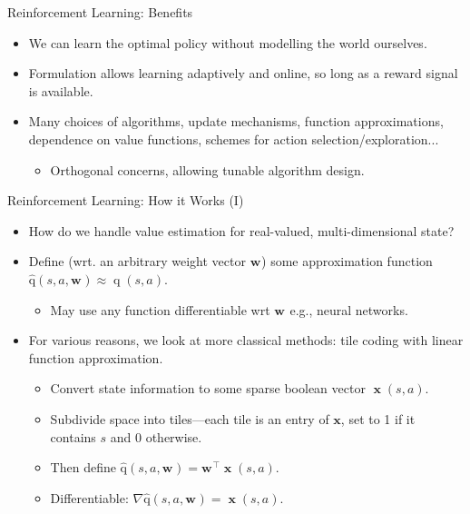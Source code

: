 \documentclass[aspectratio=169,xcolor={dvipsnames}
,hide notes
]{beamer}
\newcommand{\acval}[3]{\ensuremath{\operatorname{\hat{q}}(#1, #2, #3)}}
\newcommand{\wvec}[1]{\ensuremath{\bm{w}_{#1}}}
\begin{document}
\begin{frame}{Reinforcement Learning: Benefits}
\begin{itemize}
	\item We can learn the optimal policy \alert{without modelling the world ourselves}.
	\item Formulation allows learning adaptively and online, so long as a reward signal is available.
	\item Many choices of algorithms, update mechanisms, function approximations, dependence on value functions, schemes for action selection/exploration...
	\begin{itemize}
		\item Orthogonal concerns, allowing tunable algorithm design.
	\end{itemize}
\end{itemize}
\end{frame}

\begin{frame}{Reinforcement Learning: How it Works (I)}
\begin{itemize}
	\item How do we handle value estimation for real-valued, multi-dimensional state?
	\item Define (wrt. an arbitrary weight vector $\wvec{}$) some approximation function $\acval{s}{a}{\wvec{}} \approx \operatorname{q}(s, a)$.
	\begin{itemize}
		\item May use any function differentiable wrt $\wvec{}$ e.g., neural networks.
	\end{itemize}
\item For various reasons, we look at more classical methods: \alert{tile coding with linear function approximation}.
\begin{itemize}
	\item Convert state information to some sparse boolean vector $\operatorname{\mathbf{x}}(s, a)$.
	\item Subdivide space into tiles---each tile is an entry of $\bm{x}$, set to 1 if it contains $s$ and 0 otherwise.
	\item Then define $\acval{s}{a}{\wvec{}}=\wvec{}^{\top} \operatorname{\mathbf{x}}(s, a)$.
	\item Differentiable: $\nabla{\acval{s}{a}{\wvec{}}} = \operatorname{\mathbf{x}}(s, a)$.
\end{itemize}
\end{itemize}
\end{frame}
\end{document}
